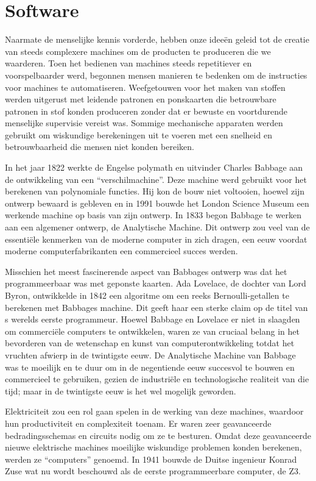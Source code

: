 \hypertarget{software}{%
\section{Software}\label{software}}

Naarmate de menselijke kennis vorderde, hebben onze ideeën geleid tot de creatie van steeds complexere machines om de producten te produceren die we waarderen. Toen het bedienen van machines steeds repetitiever en voorspelbaarder werd, begonnen mensen manieren te bedenken om de instructies voor machines te automatiseren. Weefgetouwen voor het maken van stoffen werden uitgerust met leidende patronen en ponskaarten die betrouwbare patronen in stof konden produceren zonder dat er bewuste en voortdurende menselijke supervisie vereist was. Sommige mechanische apparaten werden gebruikt om wiskundige berekeningen uit te voeren met een snelheid en betrouwbaarheid die mensen niet konden bereiken.

In het jaar 1822 werkte de Engelse polymath en uitvinder Charles Babbage aan de ontwikkeling van een ``verschilmachine''. Deze machine werd gebruikt voor het berekenen van polynomiale functies. \autocite{81} Hij kon de bouw niet voltooien, hoewel zijn ontwerp bewaard is gebleven en in 1991 bouwde het London Science Museum een werkende machine op basis van zijn ontwerp. In 1833 begon Babbage te werken aan een algemener ontwerp, de Analytische Machine. Dit ontwerp zou veel van de essentiële kenmerken van de moderne computer in zich dragen, een eeuw voordat moderne computerfabrikanten een commercieel succes werden.

Misschien het meest fascinerende aspect van Babbage\textquotesingle s ontwerp was dat het programmeerbaar was met geponste kaarten. Ada Lovelace, de dochter van Lord Byron, ontwikkelde in 1842 een algoritme om een reeks Bernoulli-getallen te berekenen met Babbage\textquotesingle s machine. Dit geeft haar een sterke claim op de titel van \textquotesingle s werelds eerste programmeur. \autocite{82} Hoewel Babbage en Lovelace er niet in slaagden om commerciële computers te ontwikkelen, waren ze van cruciaal belang in het bevorderen van de wetenschap en kunst van computerontwikkeling totdat het vruchten afwierp in de twintigste eeuw. De Analytische Machine van Babbage was te moeilijk en te duur om in de negentiende eeuw succesvol te bouwen en commercieel te gebruiken, gezien de industriële en technologische realiteit van die tijd; maar in de twintigste eeuw is het wel mogelijk geworden.

Elektriciteit zou een rol gaan spelen in de werking van deze machines, waardoor hun productiviteit en complexiteit toenam. Er waren zeer geavanceerde bedradingsschema\textquotesingle s en circuits nodig om ze te besturen. Omdat deze geavanceerde nieuwe elektrische machines moeilijke wiskundige problemen konden berekenen, werden ze ``computers'' genoemd. In 1941 bouwde de Duitse ingenieur Konrad Zuse wat nu wordt beschouwd als de eerste programmeerbare computer, de Z3.\autocite{83}

